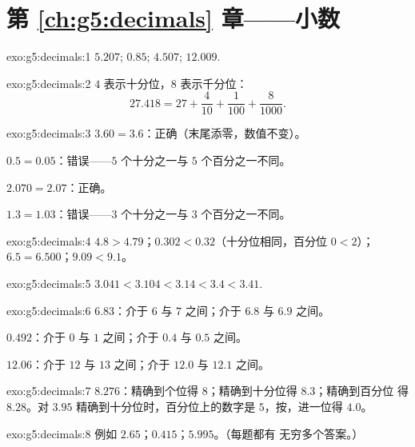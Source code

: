 \section*{第 \ref{ch:g5:decimals} 章——小数}

\begin{solution}{exo:g5:decimals:1}
$5.207$; \quad $0.85$; \quad $4.507$; \quad $12.009$.
\end{solution}

\begin{solution}{exo:g5:decimals:2}
$4$ 表示十分位，$8$ 表示千分位：
\[
27.418 = 27 + \frac{4}{10} + \frac{1}{100} + \frac{8}{1000}.
\]
\end{solution}

\begin{solution}{exo:g5:decimals:3}
$3.60 = 3.6$：正确（末尾添零，数值不变）。

$0.5 = 0.05$：错误——$5$ 个十分之一与 $5$ 个百分之一不同。

$2.070 = 2.07$：正确。

$1.3 = 1.03$：错误——$3$ 个十分之一与 $3$ 个百分之一不同。
\end{solution}

\begin{solution}{exo:g5:decimals:4}
$4.8 > 4.79$；\quad $0.302 < 0.32$（十分位相同，百分位
$0 < 2$）；\quad $6.5 = 6.500$；\quad $9.09 < 9.1$。
\end{solution}

\begin{solution}{exo:g5:decimals:5}
$3.041 < 3.104 < 3.14 < 3.4 < 3.41$.
\end{solution}

\begin{solution}{exo:g5:decimals:6}
$6.83$：介于 $6$ 与 $7$ 之间；介于 $6.8$ 与 $6.9$ 之间。

$0.492$：介于 $0$ 与 $1$ 之间；介于 $0.4$ 与 $0.5$ 之间。

$12.06$：介于 $12$ 与 $13$ 之间；介于 $12.0$ 与 $12.1$ 之间。
\end{solution}

\begin{solution}{exo:g5:decimals:7}
$8.276$：精确到个位得 $8$；精确到十分位得 $8.3$；精确到百分位
得 $8.28$。对 $3.95$ 精确到十分位时，百分位上的数字是 $5$，按，进一位得 $4.0$。
\end{solution}

\begin{solution}{exo:g5:decimals:8}
例如 $2.65$；\quad $0.415$；\quad $5.995$。（每题都有
无穷多个答案。）
\end{solution}


